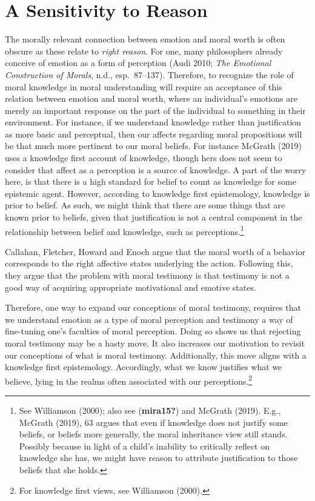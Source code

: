 \documentclass[12pt]{book}
\theoremstyle{definition}
\theoremstyle{remark}
\begin{document}
\section{A Sensitivity to Reason}\label{a-sensitivity-to-reason}

The morally relevant connection between emotion and moral worth is often obscure as these relate to \emph{right reason}. For one, many philosophers already conceive of emotion as a form of perception (Audi 2010; \emph{The {Emotional Construction} of {Morals}}, n.d., esp.~87--137). Therefore, to recognize the role of moral knowledge in moral understanding will require an acceptance of this relation between emotion and moral worth, where an individual's emotions are merely an important response on the part of the individual to something in their environment. For instance, if we understand knowledge rather than justification as more basic and perceptual, then our affects regarding moral propositions will be that much more pertinent to our moral beliefs. For instance McGrath (2019) uses a knowledge first account of knowledge, though hers does not seem to consider that affect as a perception is a source of knowledge. A part of the worry here, is that there is a high standard for belief to count as knowledge for some epistemic agent. However, according to knowledge first epistemology, knowledge is prior to belief. As such, we might think that there are some things that are known prior to beliefs, given that justification is not a central component in the relationship between belief and knowledge, such as perceptions.\footnote{See Williamson (2000); also see (\textbf{mira15?}) and McGrath (2019). E.g., McGrath (2019), 63 argues that even if knowledge does not justify some beliefs, or beliefs more generally, the moral inheritance view still stands. Possibly because in light of a child's inability to critically reflect on knowledge she has, we might have reason to attribute justification to those beliefs that she holds.}

Callahan, Fletcher, Howard and Enoch argue that the moral worth of a behavior corresponds to the right affective states underlying the action. Following this, they argue that the problem with moral testimony is that testimony is not a good way of acquiring appropriate motivational and emotive states.

Therefore, one way to expand our conceptions of moral testimony, requires that we understand emotion as a type of moral perception and testimony a way of fine-tuning one's faculties of moral perception. Doing so shows us that rejecting moral testimony may be a hasty move. It also increases our motivation to revisit our conceptions of what is moral testimony. Additionally, this move aligns with a knowledge first epistemology. Accordingly, what we know justifies what we believe, lying in the realms often associated with our perceptions.\footnote{For knowledge first views, see Williamson (2000).}
\end{document}
